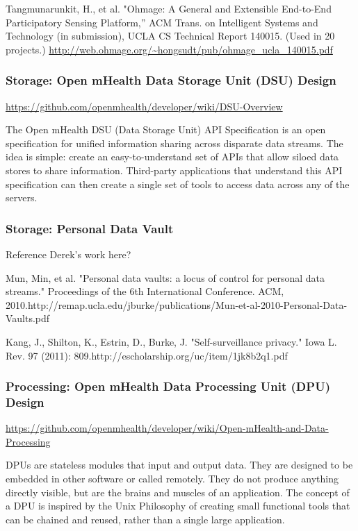 Tangmunarunkit, H., et al. "Ohmage: A General and Extensible End-to-End Participatory Sensing Platform,” ACM Trans. on Intelligent Systems and Technology (in submission), UCLA CS Technical Report 140015. (Used in 20 projects.)  \url{http://web.ohmage.org/~hongsudt/pub/ohmage_ucla_140015.pdf}



\subsubsection{Storage: Open mHealth Data Storage Unit (DSU) Design}

\url{https://github.com/openmhealth/developer/wiki/DSU-Overview}

The Open mHealth DSU (Data Storage Unit) API Specification is an open specification for unified information sharing across disparate data streams. The idea is simple: create an easy-to-understand set of APIs that allow siloed data stores to share information. Third-party applications that understand this API specification can then create a single set of tools to access data across any of the servers.


\subsubsection{Storage: Personal Data Vault} 

Reference Derek's work here? 

Mun, Min, et al. "Personal data vaults: a locus of control for personal data streams." Proceedings of the 6th International Conference. ACM, 2010.http://remap.ucla.edu/jburke/publications/Mun-et-al-2010-Personal-Data-Vaults.pdf

Kang, J., Shilton, K., Estrin, D., Burke, J. "Self-surveillance privacy." Iowa L. Rev. 97 (2011): 809.http://escholarship.org/uc/item/1jk8b2q1.pdf

\subsubsection{Processing: Open mHealth Data Processing Unit (DPU) Design}

\url{https://github.com/openmhealth/developer/wiki/Open-mHealth-and-Data-Processing}

DPUs are stateless modules that input and output data. They are designed to be embedded in other software or called remotely. They do not produce anything directly visible, but are the brains and muscles of an application. The concept of a DPU is inspired by the Unix Philosophy of creating small functional tools that can be chained and reused, rather than a single large application.

